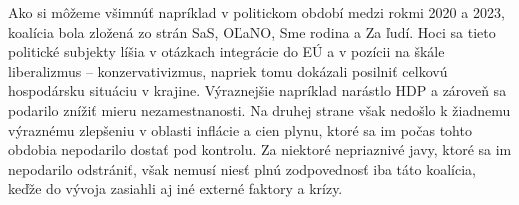 \documentclass[report.tex]{subfiles}
\begin{document}
\clearpage
Ako si môžeme všimnúť napríklad v politickom období medzi rokmi 2020 a 2023, koalícia bola zložená zo strán SaS, OĽaNO, Sme rodina a Za ľudí. Hoci sa tieto politické subjekty líšia v otázkach integrácie do EÚ a v pozícii na škále liberalizmus – konzervativizmus, napriek tomu dokázali posilniť celkovú hospodársku situáciu v krajine. Výraznejšie napríklad narástlo HDP a zároveň sa podarilo znížiť mieru nezamestnanosti. Na druhej strane však nedošlo k žiadnemu výraznému zlepšeniu v oblasti inflácie a cien plynu, ktoré sa im počas tohto obdobia nepodarilo dostať pod kontrolu. Za niektoré nepriaznivé javy, ktoré sa im nepodarilo odstrániť, však nemusí niesť plnú zodpovednosť iba táto koalícia, keďže do vývoja zasiahli aj iné externé faktory a krízy.
\end{document}
